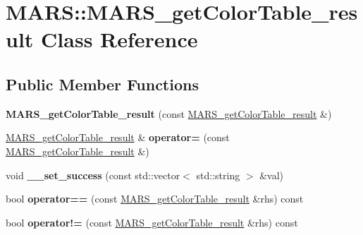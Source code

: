 \hypertarget{classMARS_1_1MARS__getColorTable__result}{}\section{M\+A\+RS\+:\+:M\+A\+R\+S\+\_\+get\+Color\+Table\+\_\+result Class Reference}
\label{classMARS_1_1MARS__getColorTable__result}
\subsection*{Public Member Functions}
\begin{DoxyCompactItemize}
\item 
\mbox{\label{classMARS_1_1MARS__getColorTable__result_a42f9c853c5fe23fd1f3c6c6f3c87d2fa}} 
{\bfseries M\+A\+R\+S\+\_\+get\+Color\+Table\+\_\+result} (const \hyperlink{classMARS_1_1MARS__getColorTable__result}{M\+A\+R\+S\+\_\+get\+Color\+Table\+\_\+result} \&)
\item 
\mbox{\label{classMARS_1_1MARS__getColorTable__result_a3c4c5e148ae5bfb819e7a2a93eb5a233}} 
\hyperlink{classMARS_1_1MARS__getColorTable__result}{M\+A\+R\+S\+\_\+get\+Color\+Table\+\_\+result} \& {\bfseries operator=} (const \hyperlink{classMARS_1_1MARS__getColorTable__result}{M\+A\+R\+S\+\_\+get\+Color\+Table\+\_\+result} \&)
\item 
\mbox{\label{classMARS_1_1MARS__getColorTable__result_a8796b7db20a0b2d8bcc761fb66c3b52e}} 
void {\bfseries \+\_\+\+\_\+set\+\_\+success} (const std\+::vector$<$ std\+::string $>$ \&val)
\item 
\mbox{\label{classMARS_1_1MARS__getColorTable__result_a94a26d274dc54acbe961a0863d0d7f63}} 
bool {\bfseries operator==} (const \hyperlink{classMARS_1_1MARS__getColorTable__result}{M\+A\+R\+S\+\_\+get\+Color\+Table\+\_\+result} \&rhs) const
\item 
\mbox{\label{classMARS_1_1MARS__getColorTable__result_a8cd8918418289948cea247563b36a5aa}} 
bool {\bfseries operator!=} (const \hyperlink{classMARS_1_1MARS__getColorTable__result}{M\+A\+R\+S\+\_\+get\+Color\+Table\+\_\+result} \&rhs) const

\end{DoxyCompactItemize}
